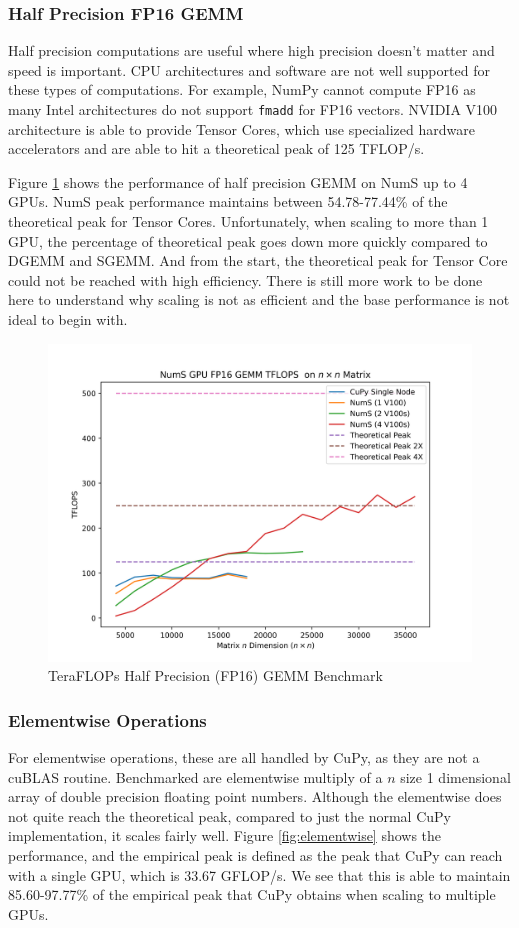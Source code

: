 \documentclass{article}
\begin{document}
\subsubsection{Half Precision FP16 GEMM}
Half precision computations are useful where high precision doesn't matter and speed is important. CPU architectures and software are not well supported for these types of computations. For example, NumPy cannot compute FP16 as many Intel architectures do not support \verb|fmadd| for FP16 vectors. NVIDIA V100 architecture is able to provide Tensor Cores, which use specialized hardware accelerators and are able to hit a theoretical peak of 125 TFLOP/s.

Figure \ref{fig:fp16gemm} shows the performance of half precision GEMM on NumS up to 4 GPUs. NumS peak performance maintains between 54.78-77.44\% of the theoretical peak for Tensor Cores. Unfortunately, when scaling to more than 1 GPU, the percentage of theoretical peak goes down more quickly compared to DGEMM and SGEMM. And from the start, the theoretical peak for Tensor Core could not be reached with high efficiency. There is still more work to be done here to understand why scaling is not as efficient and the base performance is not ideal to begin with.

\begin{figure}
  \centerline{\includegraphics[width=5in]{figures/NumS_GPU_TFLOPS_FP16GEMM.png}}
  \caption{TeraFLOPs Half Precision (FP16) GEMM Benchmark}
  \label{fig:fp16gemm}
\end{figure}

\subsubsection{Elementwise Operations}
For elementwise operations, these are all handled by CuPy, as they are not a cuBLAS routine. Benchmarked are elementwise multiply of a $n$ size 1 dimensional array of double precision floating point numbers. Although the elementwise does not quite reach the theoretical peak, compared to just the normal CuPy implementation, it scales fairly well. Figure \ref{fig:elementwise} shows the performance, and the empirical peak is defined as the peak that CuPy can reach with a single GPU, which is 33.67 GFLOP/s. We see that this is able to maintain 85.60-97.77\% of the empirical peak that CuPy obtains when scaling to multiple GPUs.
 
\end{document}
